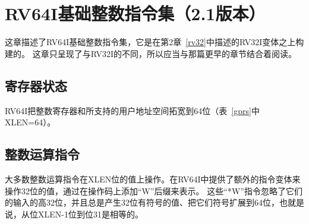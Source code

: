\chapter{RV64I基础整数指令集（2.1版本）}
\label{rv64}

这章描述了RV64I基础整数指令集，它是在第2章~\ref{rv32}中描述的RV32I变体之上构建的。
这章只呈现了与RV32I的不同，所以应当与那篇更早的章节结合着阅读。

\section{寄存器状态}

RV64I把整数寄存器和所支持的用户地址空间拓宽到64位（表~\ref{gprs}中XLEN=64）。

\section{整数运算指令}

大多数整数运算指令在XLEN位的值上操作。在RV64I中提供了额外的指令变体来操作32位的值，通过在操作码上添加“W”后缀来表示。
这些“*W”指令忽略了它们的输入的高32位，并且总是产生32位有符号的值、把它们符号扩展到64位，也就是说，从位XLEN-1位到位31是相等的。

